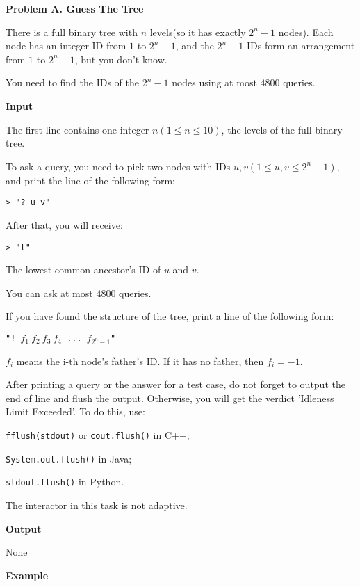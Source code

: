 \documentclass[a4paper]{article}
\begin{document}
\textbf{\Large\textsf{Problem A. Guess The Tree}}
\vspace{0.01\textheight}

There is a full binary tree with $n$ levels(so it has exactly $2^n-1$ nodes). Each node has an integer ID from $1$ to $2^n-1$, and the $2^n-1$ IDs form an arrangement from $1$ to $2^n-1$, but you don't know.

You need to find the IDs of the $2^n-1$ nodes using at most $4800$ queries.

\vspace{0.01\textheight}
\textbf{\textsf{Input}}
\vspace{0.01\textheight}

The first line contains one integer $n(1\leq n\leq 10)$, the levels of the full binary tree.

To ask a query, you need to pick two nodes with IDs $u,v(1\leq u,v\leq 2^n-1)$, and print the line of the following form:

\texttt{> "? u v"}

After that, you will receive:

\texttt{> "t"}

The lowest common ancestor's ID of $u$ and $v$.

You can ask at most $4800$ queries.

If you have found the structure of the tree, print a line of the following form:

\texttt{"! $f_1\ f_2\ f_3\ f_4$ ... $f_{2^n-1}$"}

$f_i$ means the i-th node's father's ID. If it has no father, then $f_i=-1$.

After printing a query or the answer for a test case, do not forget to output the end of line and flush the output. Otherwise, you will get the verdict 'Idleness Limit Exceeded'. To do this, use:

\texttt{fflush(stdout)} or \texttt{cout.flush()} in C++;

\texttt{System.out.flush()} in Java;

\texttt{stdout.flush()} in Python.

The interactor in this task is not adaptive.

\vspace{0.01\textheight}
\textbf{\textsf{Output}}
\vspace{0.01\textheight}


None

\vspace{0.01\textheight}
\textbf{\textsf{Example}}
\vspace{0.01\textheight}
\end{document}
